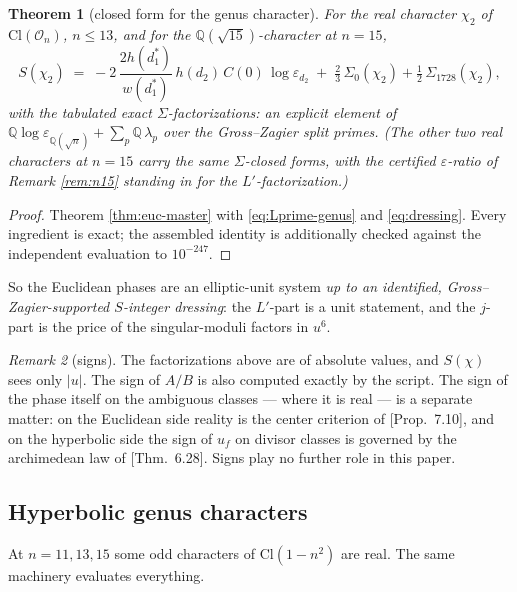 \documentclass[11pt]{amsart}
\numberwithin{equation}{section}
\theoremstyle{plain}
\newtheorem{theorem}{Theorem}[section]
\theoremstyle{definition}
\theoremstyle{remark}
\newtheorem{remark}[theorem]{Remark}
\newcommand{\Q}{\mathbb{Q}}
\newcommand{\Cl}{\mathrm{Cl}}
\newcommand{\Oc}{\mathcal{O}}
\newcommand{\eps}{\varepsilon}
\newcommand{\PaperI}{\cite{SchmidtI}}
\begin{document}
\begin{theorem}[closed form for the genus character]\label{thm:genus-closed}
For the real character $\chi_2$ of $\Cl(\Oc_n)$, $n \le 13$, and for the
$\Q(\sqrt{15})$-character at $n = 15$,
\[
  S(\chi_2) \;=\; -2\,\frac{2h(d_1^*)}{w(d_1^*)}\,h(d_2)\,C(0)\,\log\eps_{d_2}
  \;+\; \tfrac23\,\Sigma_0(\chi_2) + \tfrac12\,\Sigma_{1728}(\chi_2),
\]
with the tabulated exact $\Sigma$-factorizations: an explicit element of
$\Q\log\eps_{\Q(\sqrt n)} + \sum_p\Q\,\lambda_p$ over the Gross--Zagier
split primes.  (The other two real characters at $n = 15$ carry the same
$\Sigma$-closed forms, with the certified $\eps$-ratio of Remark
\ref{rem:n15} standing in for the $L'$-factorization.)
\end{theorem}

\begin{proof}
Theorem \ref{thm:euc-master} with \eqref{eq:Lprime-genus} and
\eqref{eq:dressing}.  Every ingredient is exact; the assembled identity
is additionally checked against the independent evaluation to
$10^{-247}$.
\end{proof}

So the Euclidean phases are an elliptic-unit system \emph{up to an
identified, Gross--Zagier-supported $S$-integer dressing}: the $L'$-part
is a unit statement, and the $j$-part is the price of the singular-moduli
factors in $u^6$.

\begin{remark}[signs]
The factorizations above are of absolute values, and $S(\chi)$ sees only
$|u|$.  The sign of $A/B$ is also computed exactly by the script.  The
sign of the phase itself on the ambiguous classes --- where it is real ---
is a separate matter: on the Euclidean side reality is the center
criterion of \PaperI[Prop.~7.10], and on the hyperbolic side the sign of
$u_f$ on divisor classes is governed by the archimedean law of
\PaperI[Thm.~6.28].  Signs play no further role in this paper.
\end{remark}

\subsection{Hyperbolic genus characters}\label{subsec:genus-hyp}

At $n = 11, 13, 15$ some odd characters of $\Cl(1 - n^2)$ are real.  The
same machinery evaluates everything.
\end{document}
